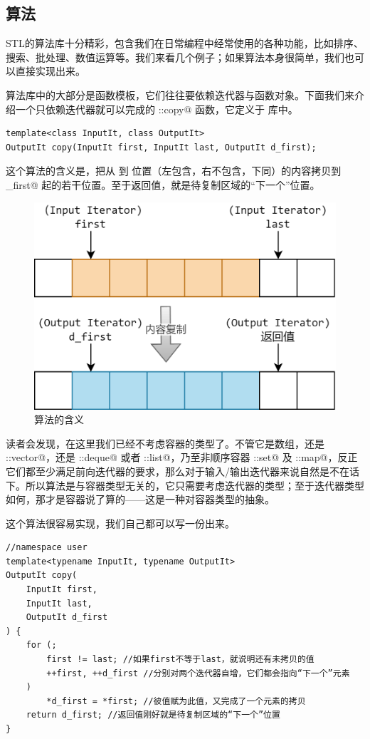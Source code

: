 \subsection*{算法}
STL的算法库十分精彩，包含我们在日常编程中经常使用的各种功能，比如排序、搜索、批处理、数值运算等。我们来看几个例子；如果算法本身很简单，我们也可以直接实现出来。\par
算法库中的大部分是函数模板，它们往往要依赖迭代器与函数对象。下面我们来介绍一个只依赖迭代器就可以完成的 \lstinline@std::copy@ 函数，它定义于 \lstinline@algorithm@ 库中。
\begin{lstlisting}
template<class InputIt, class OutputIt>
OutputIt copy(InputIt first, InputIt last, OutputIt d_first);
\end{lstlisting}
这个算法的含义是，把从 \lstinline@first@ 到 \lstinline@last@ 位置（左包含，右不包含，下同）的内容拷贝到 \lstinline@d_first@ 起的若干位置。至于返回值，就是待复制区域的``下一个''位置。\par
\begin{figure}[htbp]
    \centering
    \includegraphics[width=.6\textwidth]{../images/generalized_parts/11_algorithm_copy.png}
    \caption{\lstinline@copy@ 算法的含义}
\end{figure}
读者会发现，在这里我们已经不考虑容器的类型了。不管它是数组，还是 \lstinline@std::vector@，还是 \lstinline@std::deque@ 或者 \lstinline@std::list@，乃至非顺序容器 \lstinline@std::set@ 及 \lstinline@std::map@，反正它们都至少满足前向迭代器的要求，那么对于输入/输出迭代器来说自然是不在话下。所以算法是与容器类型无关的，它只需要考虑迭代器的类型；至于迭代器类型如何，那才是容器说了算的——这是一种对容器类型的抽象。\par
这个算法很容易实现，我们自己都可以写一份出来。
\begin{lstlisting}
//namespace user
template<typename InputIt, typename OutputIt>
OutputIt copy(
    InputIt first,
    InputIt last,
    OutputIt d_first
) {
    for (; 
        first != last; //如果first不等于last，就说明还有未拷贝的值
        ++first, ++d_first //分别对两个迭代器自增，它们都会指向“下一个”元素
    )
        *d_first = *first; //彼值赋为此值，又完成了一个元素的拷贝
    return d_first; //返回值刚好就是待复制区域的“下一个”位置
}
\end{lstlisting}
